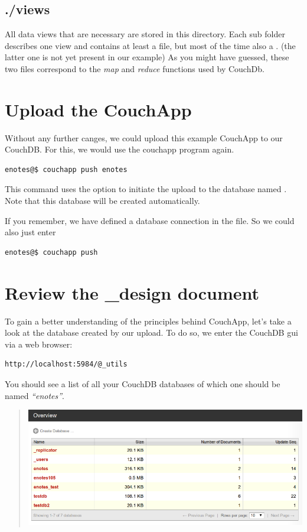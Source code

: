 \documentclass[letterpaper,10pt,english]{sphinxmanual}
\begin{document}
\subsection{./views}
\label{2-Start:views}
All data views that are necessary are stored in this directory. Each sub folder describes one view and contains at least a  file, but most of the time also a . (the latter one is not yet present in our example)
As you might have guessed, these two files correspond to the \emph{map} and \emph{reduce} functions used by CouchDb.


\section{Upload the CouchApp}
\label{2-Start:upload-the-couchapp}
Without any further canges, we could upload this example CouchApp to our CouchDB. For this, we would use the couchapp program again.

\begin{Verbatim}[commandchars=@\[\]]
enotes@$ couchapp push enotes
\end{Verbatim}

This command uses the option  to initiate the upload to the database named . Note that this database will be created automatically.

If you remember, we have defined a database connection in the  file. So we could also just enter

\begin{Verbatim}[commandchars=@\[\]]
enotes@$ couchapp push
\end{Verbatim}


\section{Review the \_design document}
\label{2-Start:review-the-design-document}
To gain a better understanding of the principles behind CouchApp, let's take a look at the database created by our upload.
To do so, we enter the CouchDB gui via a web browser:

\begin{Verbatim}[commandchars=@\[\]]
http://localhost:5984/@_utils
\end{Verbatim}

You should see a list of all your CouchDB databases of which one should be named \emph{``enotes''}.
\begin{quote}

\includegraphics{2_firstdb.png}
\end{quote}
\end{document}

